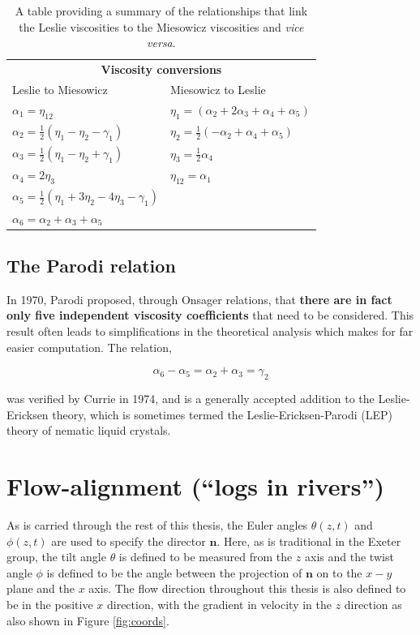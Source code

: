 \begin{table}
\centering
\begin{tabular}{ll} 
\hline\hline
\multicolumn{2}{c}{\textbf{Viscosity conversions}}\\             
Leslie to Miesowicz&Miesowicz to Leslie\\
\hline
$\alpha_1=\eta_{12}$&$\eta_1=\left(\alpha_2+2\alpha_3+\alpha_4+\alpha_5\right)$\\
$\alpha_2=\frac{1}{2}\left(\eta_1-\eta_2-\gamma_1\right)$&$\eta_2=\frac{1}{2}\left(-\alpha_2+\alpha_4+\alpha_5\right)$\\
$\alpha_3=\frac{1}{2}\left(\eta_1-\eta_2+\gamma_1\right)$&$\eta_3=\frac{1}{2}\alpha_4$\\
$\alpha_4=2\eta_3$&$\eta_{12}=\alpha_1$\\
$\alpha_5=\frac{1}{2}\left(\eta_1+3\eta_2-4\eta_3-\gamma_1\right)$&\\
$\alpha_6=\alpha_2+\alpha_3+\alpha_5$&\\
\hline
\end{tabular}
\caption[Relationships between the Leslie and Miesowicz viscosities]{A table providing a summary of the relationships that link the Leslie viscosities to the Miesowicz viscosities and \textit{vice versa}.} 
\label{tab:viscosity_relations}
\end{table}

\subsection{The Parodi relation}
In 1970, Parodi \cite{Parodi1970} proposed, through Onsager relations, that \textbf{there are in fact only five independent viscosity coefficients} that need to be considered. This result often leads to simplifications in the theoretical analysis which makes for far easier computation. The relation,

\begin{equation}
 \alpha_6-\alpha_5=\alpha_2+\alpha_3=\gamma_2
\end{equation}

\noindent was verified by Currie \cite{Currie1974} in 1974, and is a generally accepted addition to the Leslie-Ericksen theory, which is sometimes termed the Leslie-Ericksen-Parodi (LEP) theory of nematic liquid crystals.

\section{Flow-alignment (``logs in rivers'')}
\label{sec:logs}
As is carried through the rest of this thesis, the Euler angles $\theta\left(z,t\right)$ and $\phi\left(z,t\right)$ are used to specify the director $\mathbf{n}$. Here, as is traditional in the Exeter group, the tilt angle $\theta$ is defined to be measured from the $z$ axis and the twist angle $\phi$ is defined to be the angle between the projection of $\mathbf{n}$ on to the $x-y$ plane and the $x$ axis. The flow direction throughout this thesis is also defined to be in the positive $x$ direction, with the gradient in velocity in the $z$ direction as also shown in Figure \ref{fig:coords}. 

